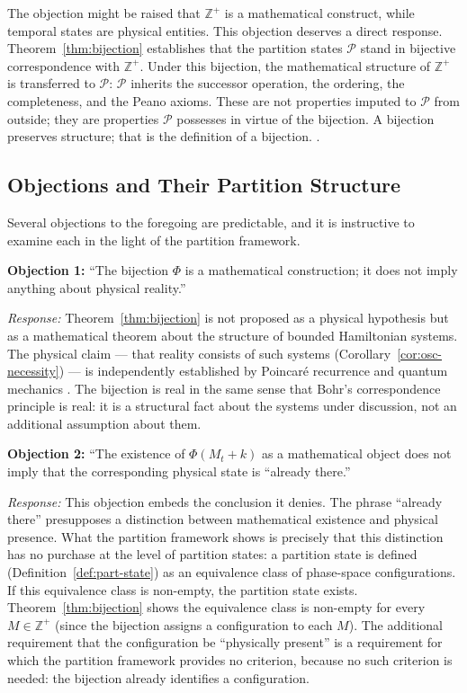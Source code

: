 \documentclass[twocolumn,10pt,a4paper]{article}
\theoremstyle{thmstyle}
\theoremstyle{definition}
\theoremstyle{remark}
\newcommand{\Zp}{\mathbb{Z}^{+}}
\newcommand{\Parts}{\mathcal{P}}
\newcommand{\PhiMap}{\varPhi}
\begin{document}
The objection might be raised that $\Zp$ is a mathematical construct, while temporal states are physical entities. This objection deserves a direct response. Theorem~\ref{thm:bijection} establishes that the partition states $\Parts$ stand in bijective correspondence with $\Zp$. Under this bijection, the mathematical structure of $\Zp$ is transferred to $\Parts$: $\Parts$ inherits the successor operation, the ordering, the completeness, and the Peano axioms. These are not properties imputed to $\Parts$ from outside; they are properties $\Parts$ possesses in virtue of the bijection. A bijection preserves structure; that is the definition of a bijection. \citep{cantor1874,cantor1891,dedekind1888}.

\subsection{Objections and Their Partition Structure}

Several objections to the foregoing are predictable, and it is instructive to examine each in the light of the partition framework.

\textbf{Objection 1:} ``The bijection $\PhiMap$ is a mathematical construction; it does not imply anything about physical reality.''

\textit{Response:} Theorem~\ref{thm:bijection} is not proposed as a physical hypothesis but as a mathematical theorem about the structure of bounded Hamiltonian systems. The physical claim --- that reality consists of such systems (Corollary~\ref{cor:osc-necessity}) --- is independently established by Poincar\'e recurrence and quantum mechanics \citep{poincare1890,penrose1989}. The bijection is real in the same sense that Bohr's correspondence principle is real: it is a structural fact about the systems under discussion, not an additional assumption about them.

\textbf{Objection 2:} ``The existence of $\PhiMap(M_t + k)$ as a mathematical object does not imply that the corresponding physical state is ``already there.''

\textit{Response:} This objection embeds the conclusion it denies. The phrase ``already there'' presupposes a distinction between mathematical existence and physical presence. What the partition framework shows is precisely that this distinction has no purchase at the level of partition states: a partition state is defined (Definition~\ref{def:part-state}) as an equivalence class of phase-space configurations. If this equivalence class is non-empty, the partition state exists. Theorem~\ref{thm:bijection} shows the equivalence class is non-empty for every $M \in \Zp$ (since the bijection assigns a configuration to each $M$). The additional requirement that the configuration be ``physically present'' is a requirement for which the partition framework provides no criterion, because no such criterion is needed: the bijection already identifies a configuration.
\end{document}
